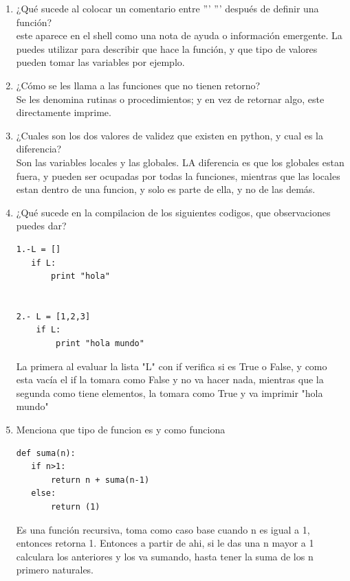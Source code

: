 \documentclass[letterpaper, 12pt, oneside]{article}%
\begin{document}
\begin{enumerate}%
	\item ¿Qué sucede al colocar un comentario entre ''' ''' después de definir una función? \\
	 este aparece en el shell como una nota de ayuda o información emergente. La puedes utilizar para describir que hace la función, y que tipo de valores pueden tomar las variables por ejemplo.
	
	\item ¿Cómo se les llama a las funciones que no tienen retorno?\\
	Se les denomina rutinas o procedimientos; y en vez de retornar algo, este directamente imprime.
	\item ¿Cuales son los dos valores de validez que existen en python, y cual es la diferencia?\\
	Son las variables locales y las globales. LA diferencia es que los globales estan fuera, y pueden ser ocupadas por todas la funciones, mientras que las locales estan dentro de una funcion, y solo es parte de ella, y no de las demás.
	
	\item ¿Qué sucede en la compilacion de los siguientes codigos, que observaciones puedes dar?\\
	\begin{lstlisting}
1.-L = []
   if L:
       print "hola"
	
	
2.- L = [1,2,3]
    if L:
        print "hola mundo" 
	\end{lstlisting}
	La primera al evaluar la lista "L" con if verifica si es True o False, y como esta vacía el if la tomara como False y no va hacer nada, mientras que la segunda como tiene elementos, la tomara como True y va imprimir "hola mundo"

	\item Menciona que tipo de funcion es y como funciona \begin{lstlisting}
def suma(n):
   if n>1:
       return n + suma(n-1)
   else:
       return (1)
	\end{lstlisting}
	
	Es una función recursiva, toma como caso base cuando n es igual a 1, entonces retorna 1. Entonces a partir de ahi, si le das una n mayor a 1 calculara los anteriores y los va sumando, hasta tener la suma de los n primero naturales.
	
	 
	
	
	
	
	
\end{enumerate}%
\end{document}
